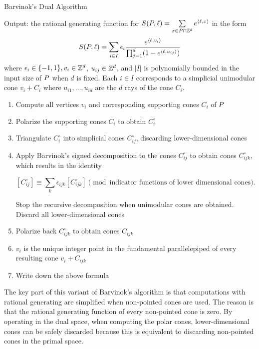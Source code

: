 \begin{algorithm}
\caption{Barvinok's Dual Algorithm}
\label{alg:barvinok-dual}
\begin{justify}
Output: the rational generating function for $S({ P}, \ell) = \sum\limits_{x \in { P} \cap {\mathbb Z}^d} e^{\langle \ell, x \rangle}$ in the form
\[S({ P},\ell) = \sum_{i \in I} \epsilon_i \frac{e^{\langle \ell, v_i \rangle}}{\prod_{j=1}^d ( 1 - e^{\langle \ell, u_{ij}\rangle})}\] 
where $\epsilon_i \in \{-1,1\}, v_i \in {\mathbb Z}^d$, $u_{ij} \in {\mathbb Z}^d$, and $|I|$ is polynomially bounded in the input size of ${ P}$ when $d$ is fixed. Each $i \in I$ corresponds to a simplicial unimodular cone $v_i + C_i$ where $u_{i1}, \dots, u_{id}$ are the $d$ rays of the cone $C_i$.
\end{justify}
\begin{enumerate}
\item  Compute all vertices $v_i$ and corresponding supporting cones $C_i$ of ${ P}$
\item Polarize the supporting cones $C_i$ to obtain $C_i^\circ$
\item Triangulate $C_i^\circ$ into simplicial cones $C_{ij}^\circ$, discarding lower-dimensional cones
\item Apply Barvinok’s signed decomposition to the cones $C_{ij}^\circ$ to obtain cones $C_{ijk}^\circ$, which results in the identity

\[ [C^\circ_{ij}] \equiv \sum_{k} \epsilon_{ijk} [C^\circ_{ijk}] \pmod{\text{indicator functions of lower dimensional cones}}.\]

Stop the recursive decomposition when unimodular cones are obtained. Discard all lower-dimensional cones
\item Polarize back $C_{ijk}^\circ$ to obtain cones $C_{ijk}$
\item $v_i$ is the unique integer point in the fundamental parallelepiped of every resulting cone $v_i+C_{ijk}$
\item Write down the above formula
\end{enumerate}
\end{algorithm}

The key part of this variant of Barvinok's algorithm is that computations with rational generating are simplified when non-pointed cones are used. The reason is that the rational generating
function of every non-pointed cone is zero. By operating in the dual space, when computing the polar cones, lower-dimensional cones can be safely discarded because this is equivalent to discarding non-pointed cones in the primal space. 


